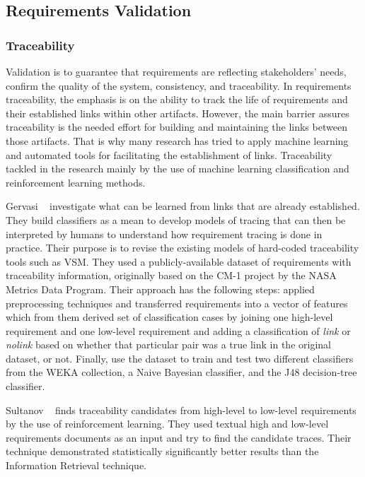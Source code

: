 \subsection{Requirements Validation}

\subsubsection{Traceability}

Validation is to guarantee that requirements are reflecting stakeholders' needs,
confirm the quality of the system, consistency, and traceability.
In requirements traceability, the emphasis is on the ability to track the life of
requirements and their established links within other artifacts. However, the
main barrier assures traceability is the needed effort for building and
maintaining the links between those artifacts. That is why many research has
tried to apply machine learning and automated tools for facilitating the
establishment of links\cite{Gervasi:2011}.
Traceability tackled in the research mainly by the use of machine learning
classification and reinforcement learning methods.

Gervasi \etal~\cite{Gervasi:2011} investigate what can be learned from links that are already established. They build classifiers as a mean to develop models of tracing that can then be interpreted by humans to understand how requirement tracing is done in practice. Their purpose is to revise the existing models of hard-coded traceability tools such as VSM. They used a publicly-available dataset of requirements with traceability information, originally based on the CM-1 project by the NASA Metrics Data Program. Their approach has the following steps: applied preprocessing techniques and transferred requirements into a vector of features which from them derived set of classification cases by joining one high-level requirement and one low-level requirement and adding a classification of \textit{link} or \textit{nolink} based on whether that particular pair was a true link in the original dataset, or not. Finally, use the dataset to train and test two different classifiers from the WEKA collection, a Naive Bayesian classifier, and the J48 decision-tree classifier.

Sultanov \etal~\cite{Sultanov:2013} finds traceability candidates from
high-level to low-level requirements by the use of reinforcement
learning. They used textual high and low-level requirements documents as an input and try to
find the candidate traces. Their technique demonstrated statistically
significantly better results than the Information Retrieval technique.





